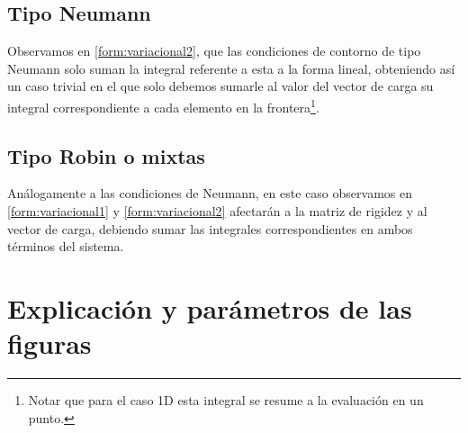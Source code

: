 \documentclass[11pt]{book}
\theoremstyle{plain} %
\theoremstyle{definition} %
\theoremstyle{definition} %
\begin{document}
\subsection{Tipo Neumann}

Observamos en \ref{form:variacional2}, que las condiciones de contorno de tipo Neumann solo suman la integral
referente a esta a la forma lineal, obteniendo así un caso trivial en el que solo debemos sumarle al valor del vector de carga
su integral correspondiente a cada elemento en la frontera\footnote{Notar que para el caso 1D esta integral se resume a la evaluación en un punto.}.

\subsection{Tipo Robin o mixtas}

Análogamente a las condiciones de Neumann, en este caso observamos en \ref{form:variacional1} y \ref{form:variacional2} afectarán a la matriz de rigidez y al vector de carga,
debiendo sumar las integrales correspondientes en ambos términos del sistema.


\section{Explicación y parámetros de las figuras}
\end{document}
